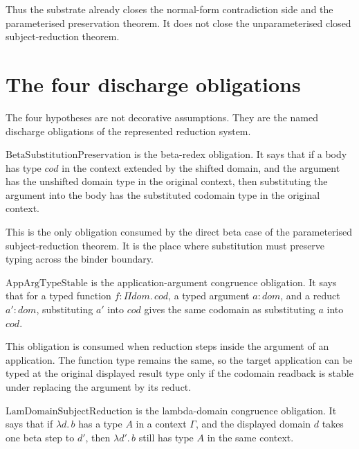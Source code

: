 Thus the substrate already closes the normal-form contradiction side and the parameterised preservation theorem. It does not close the unparameterised closed subject-reduction theorem.

\section{The four discharge obligations}
\label{sec:metacic-subject-reduction-four-obligations}

The four hypotheses are not decorative assumptions. They are the named discharge obligations of the represented reduction system.

\begin{definition}[BetaSubstitutionPreservation]
\label{def:metacic-beta-substitution-preservation}
$\mathrm{BetaSubstitutionPreservation}$ is the beta-redex obligation. It says that if a body has type $cod$ in the context extended by the shifted domain, and the argument has the unshifted domain type in the original context, then substituting the argument into the body has the substituted codomain type in the original context.
\end{definition}

This is the only obligation consumed by the direct beta case of the parameterised subject-reduction theorem. It is the place where substitution must preserve typing across the binder boundary.

\begin{definition}[AppArgTypeStable]
\label{def:metacic-app-arg-type-stable}
$\mathrm{AppArgTypeStable}$ is the application-argument congruence obligation. It says that for a typed function $f : \Pi dom.\,cod$, a typed argument $a : dom$, and a reduct $a' : dom$, substituting $a'$ into $cod$ gives the same codomain as substituting $a$ into $cod$.
\end{definition}

This obligation is consumed when reduction steps inside the argument of an application. The function type remains the same, so the target application can be typed at the original displayed result type only if the codomain readback is stable under replacing the argument by its reduct.

\begin{definition}[LamDomainSubjectReduction]
\label{def:metacic-lam-domain-subject-reduction}
$\mathrm{LamDomainSubjectReduction}$ is the lambda-domain congruence obligation. It says that if $\lambda d.\,b$ has a type $A$ in a context $\Gamma$, and the displayed domain $d$ takes one beta step to $d'$, then $\lambda d'.\,b$ still has type $A$ in the same context.
\end{definition}

